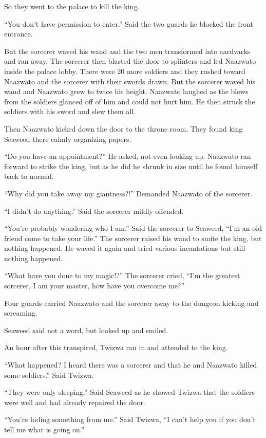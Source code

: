 So they went to the palace to kill the king.

``You don't have permission to enter.'' Said the two guards he blocked the front entrance.

But the sorcerer waved his wand and the two men transformed into aardvarks and ran away. The sorcerer then blasted the door to splinters and led Naazwato inside the palace lobby. There were 20 more soldiers and they rushed toward Naazwato and the sorcerer with their swords drawn. But the sorcerer waved his wand and Naazwato grew to twice his height. Naazwato laughed as the blows from the soldiers glanced off of him and could not hurt him. He then struck the soldiers with his sword and slew them all.

Then Naazwato kicked down the door to the throne room. They found king Seaweed there calmly organizing papers.

``Do you have an appointment?'' He asked, not even looking up.
Naazwato ran forward to strike the king, but as he did he shrunk in size until he found himself back to normal.

``Why did you take away my giantness?!'' Demanded Naazwato of the sorcerer. 

``I didn't do anything.'' Said the sorcerer mildly offended.

``You're probably wondering who I am.'' Said the sorcerer to Seaweed, ``I'm an old friend come to take your life.''
The sorcerer raised his wand to smite the king, but nothing happened.  
He waved it again and tried various incantations but still nothing happened.

``What have you done to my magic!?''
The sorcerer cried, ``I'm the greatest sorcerer, I am your master, how have you overcome me?''

Four guards carried Naazwato and the sorcerer away to the dungeon kicking and screaming.

Seaweed said not a word, but looked up and smiled.

An hour after this transpired, Twizwa ran in and attended to the king.

``What happened? I heard there was a sorcerer and that he and Naazwato killed some soldiers.'' Said Twizwa.

``They were only sleeping.'' Said Seaweed as he showed Twizwa that the soldiers were well and had already repaired the door.

``You're hiding something from me.'' Said Twizwa, ``I can't help you if you don't tell me what is going on.''

